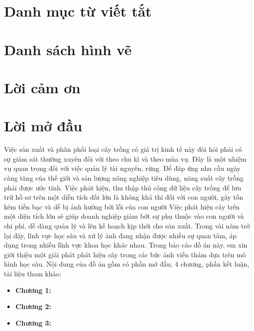 \documentclass[a4paper, 12pt]{report}
\begin{document}
\tableofcontents{}

\chapter*{Danh mục từ viết tắt}


\chapter*{Danh sách hình vẽ}

\chapter*{Lời cảm ơn}

\chapter*{Lời mở đầu}
Việc sản xuất và phân phối loại cây trồng có giá trị kinh tế này đòi hỏi phải có sự giám sát thường xuyên đối với theo chu kì và theo mùa vụ. Đây là một nhiệm vụ quan trọng đối với việc quản lý tài nguyên, rừng. Để đáp ứng nhu cầu ngày càng tăng của thế giới và sản lượng nông nghiệp tiêu dùng, năng suất cây trồng phải được ước tính. Việc phát hiện, thu thập thủ công dữ liệu cây trồng để lưu trữ hồ sơ trên một diễn tích đất lớn là không khả thi đối với con người, gây tốn kém tiền bạc và dễ bị ảnh hưởng bởi lỗi của con người
Việc phát hiện cây trên một diện tích lớn sẽ giúp doanh nghiệp giảm bớt sự phụ thuộc vào con người và chi phí, dễ dàng quản lý và lên kế hoạch kịp thời cho sản xuất. Trong vài năm trở lại đây, lĩnh vực học sâu và xử lý ảnh đang nhận được nhiều sự quan tâm, áp dụng trong nhiều lĩnh vực khoa học khác nhau. Trong báo cáo đồ án này, em xin giới thiệu một giải phát phát hiện cây trong các bức ảnh viễn thám dựa trên mô hình học sâu. Nội dung của đồ án gồm có phần mở đầu, 4 chương, phần kết luận, tài liệu tham khảo:
\begin{itemize}
	\item \textbf{Chương 1: }
	
	\item \textbf{Chương 2: }

	\item \textbf{Chương 3: }

\end{itemize}
\end{document}
